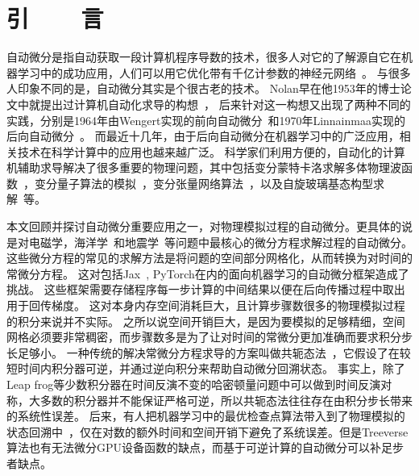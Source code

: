 \documentclass[A4,twoside,fontset=ubuntu,UTF8]{ctexart}
\begin{document}
\section{引~~~~言}
    自动微分是指自动获取一段计算机程序导数的技术，很多人对它的了解源自它在机器学习中的成功应用，人们可以用它优化带有千亿计参数的神经元网络~\cite{Rosset2019}。
与很多人印象不同的是，自动微分其实是个很古老的技术。
Nolan早在他1953年的博士论文中就提出过计算机自动化求导的构想~\cite{Nolan1953}，
后来针对这一构想又出现了两种不同的实践，分别是1964年由Wengert实现的前向自动微分~\cite{Wengert1964}和1970年Linnainmaa实现的后向自动微分~\cite{Linnainmaa1976}。
而最近十几年，由于后向自动微分在机器学习中的广泛应用，相关技术在科学计算中的应用也越来越广泛。
科学家们利用方便的，自动化的计算机辅助求导解决了很多重要的物理问题，其中包括变分蒙特卡洛求解多体物理波函数~\cite{Gutzwiller1963,Carleo2017, Deng2017,Cai2018}，变分量子算法的模拟~\cite{Luo2019}，变分张量网络算法~\cite{Liao2019}，以及自旋玻璃基态构型求解~\cite{Liu2020}等。

本文回顾并探讨自动微分重要应用之一，对物理模拟过程的自动微分。更具体的说是对电磁学，海洋学~\cite{Heimbach2005}和地震学~\cite{Symes2007,Zhu2020}等问题中最核心的微分方程求解过程的自动微分。
这些微分方程的常见的求解方法是将问题的空间部分网格化，从而转换为对时间的常微分方程。
这对包括Jax~\cite{James2018}, PyTorch在内的面向机器学习的自动微分框架造成了挑战。
这些框架需要存储程序每一步计算的中间结果以便在后向传播过程中取出用于回传梯度。
这对本身内存空间消耗巨大，且计算步骤数很多的物理模拟过程的积分来说并不实际。
之所以说空间开销巨大，是因为要模拟的足够精细，空间网格必须要非常稠密，而步骤数多是为了让对时间的常微分更加准确而要求积分步长足够小。
一种传统的解决常微分方程求导的方案叫做共轭态法~\cite{Plessix2006,Chen2018}，它假设了在较短时间内积分器可逆，并通过逆向积分来帮助自动微分回溯状态。
事实上，除了Leap frog等少数积分器在时间反演不变的哈密顿量问题中可以做到时间反演对称，大多数的积分器并不能保证严格可逆，所以共轭态法往往存在由积分步长带来的系统性误差。
后来，有人把机器学习中的最优检查点算法带入到了物理模拟的状态回溯中~\cite{Symes2007}，仅在对数的额外时间和空间开销下避免了系统误差。但是Treeverse算法也有无法微分GPU设备函数的缺点，而基于可逆计算的自动微分可以补足步者缺点。
\end{document}
